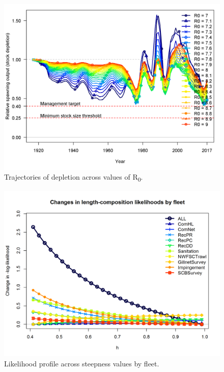 \documentclass[12pt,]{article}
\begin{document}
\begin{figure}[htbp]
\centering
\includegraphics{Figures/profile_R0_depl.png}
\caption{Trajectories of depletion across values of R\textsubscript{0}.
\label{fig:profile_R0_depl}}
\end{figure}

\FloatBarrier

\begin{figure}[htbp]
\centering
\includegraphics{Figures/profile_h_piner.png}
\caption{Likelihood profile across steepness values by fleet.
\label{fig:profile_h_piner}}
\end{figure}
\end{document}
